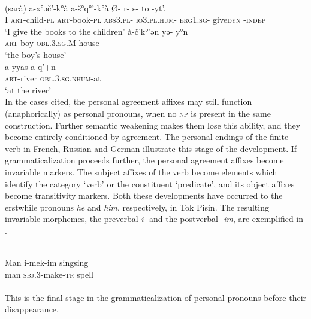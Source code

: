 \ea\label{ex:E10}
\langinfo{\LangAbkh}{}{} \\
 \ea
 \gll (sarà)  a-x°əč'-k°à                  a-š°q°'-k°à                          Ø- r- s- to -yt'.\\
I            \textsc{art}-child-\textsc{pl}  \textsc{art}-book-\textsc{pl}  \textsc{abs}3.\textsc{pl}- \textsc{io}3.\textsc{pl}.\textsc{hum}- \textsc{erg}1.\textsc{sg}- give\textsc{dyn} -\textsc{indep}\\
\glt ‘I give the books to the children’
\ex 
\gll à-č'k°'ən  yə- y°n\\
 \textsc{art}-boy  \textsc{obl}.3.\textsc{sg}.M-house\\
\glt ‘the boy's house’\\
\ex
\gll a-yyas  a-q'+n\\
 \textsc{art}-river  \textsc{obl}.3.\textsc{sg}.\textsc{nhum}-at\\
\glt ‘at the river’\\
\z
\z
\noindent In the cases cited, the personal agreement affixes may still function (anaphorically) as personal pronouns, when no \textsc{np} is present in the same construction. Further semantic weakening makes them lose this ability, and they become entirely conditioned by agreement. The personal endings of the finite verb in French, Russian and German illustrate this stage of the development. If grammaticalization proceeds further, the personal agreement affixes become invariable markers. The subject affixes of the verb become elements which identify the category ‘verb’ or the constituent ‘predicate’, and its object affixes become transitivity markers. Both these developments have occurred to the erstwhile pronouns \textit{he} and \textit{him}, respectively, in Tok Pisin. The resulting invariable morphemes, the preverbal \textit{i}{}- and the postverbal -\textit{im}, are exemplified in .

\ea\label{ex:E11}
 \\
\gll  Man  i-mek-im  singsing\\
man  \textsc{sbj}.3-make-\textsc{tr}  spell\\
 \\
\z
\noindent This is the final stage in the grammaticalization of personal pronouns before their disappearance.

